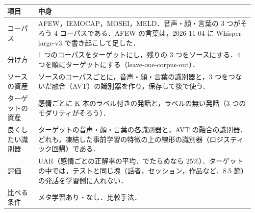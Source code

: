 \documentclass[11pt,a4paper]{ltjsarticle}
\begin{document}
\begin{center}
\begin{tabularx}{\linewidth}{@{}p{30mm}L@{}}
\toprule
項目 & 中身 \\
\midrule
コーパス & AFEW，IEMOCAP，MOSEI，MELD．音声・顔・言葉の 3 つがそろう 4 コーパスである．AFEW の言葉は，2026-11-04 に Whisper large-v3 で書き起こして足した． \\
分け方 & 1 つのコーパスをターゲットにし，残りの 3 つをソースにする．4 つを順にターゲットにする（leave-one-corpus-out）． \\
ソースの資産 & ソースのコーパスごとに，音声・顔・言葉の識別器と，3 つをつないだ融合（AVT）の識別器を作り，保存して後で使う． \\
ターゲットの資産 & 感情ごとに K 本のラベル付きの発話と，ラベルの無い発話（3 つのモダリティがそろう）． \\
良くしたい識別器 & ターゲットの音声・顔・言葉の各識別器と，AVT の融合の識別器．どれも，凍結した事前学習の特徴の上の線形の識別器（ロジスティック回帰）である． \\
評価 & UAR（感情ごとの正解率の平均．でたらめなら 25\%）．ターゲットの中では，テストと同じ塊（話者，セッション，作品など．8.5 節）の発話を学習側に入れない． \\
比べる条件 & メタ学習あり・なし．比較手法． \\
\bottomrule
\end{tabularx}
\end{center}

\begin{center}
\end{center}
\end{document}
